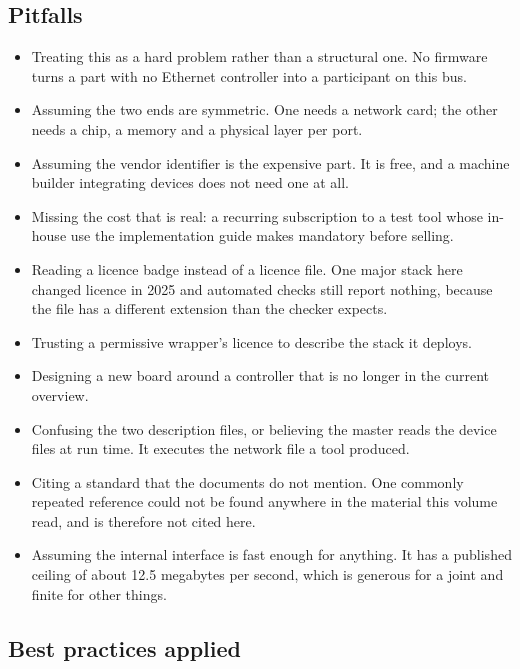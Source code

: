 \subsection*{Pitfalls}

\begin{itemize}
\item Treating this as a hard problem rather than a structural one. No firmware
turns a part with no Ethernet controller into a participant on this bus.
\item Assuming the two ends are symmetric. One needs a network card; the other
needs a chip, a memory and a physical layer per port.
\item Assuming the vendor identifier is the expensive part. It is free, and a
machine builder integrating devices does not need one at all.
\item Missing the cost that is real: a recurring subscription to a test tool
whose in-house use the implementation guide makes mandatory before selling.
\item Reading a licence badge instead of a licence file. One major stack here
changed licence in 2025 and automated checks still report nothing, because the
file has a different extension than the checker expects.
\item Trusting a permissive wrapper's licence to describe the stack it deploys.
\item Designing a new board around a controller that is no longer in the current
overview.
\item Confusing the two description files, or believing the master reads the
device files at run time. It executes the network file a tool produced.
\item Citing a standard that the documents do not mention. One commonly repeated
reference could not be found anywhere in the material this volume read, and is
therefore not cited here.
\item Assuming the internal interface is fast enough for anything. It has a
published ceiling of about 12.5 megabytes per second, which is generous for a
joint and finite for other things.
\end{itemize}

\subsection*{Best practices applied}

